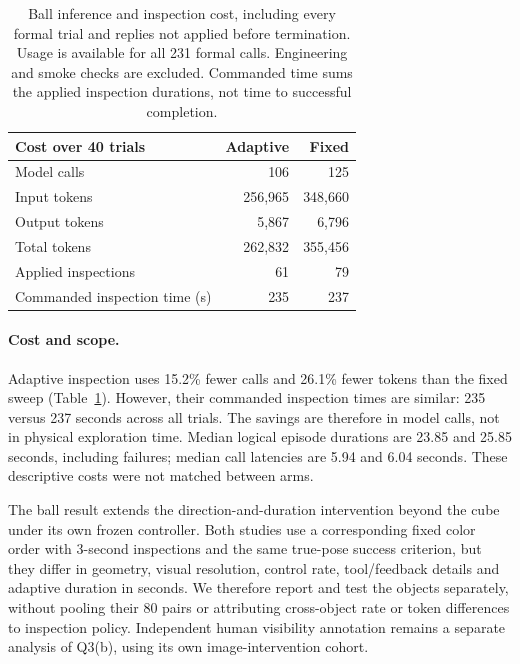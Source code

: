 \begin{table}[t]
\centering\small
\setlength{\tabcolsep}{4pt}
\begin{tabular}{lrr}
\toprule
Cost over 40 trials & Adaptive & Fixed\\
\midrule
Model calls & 106 & 125\\
Input tokens & 256,965 & 348,660\\
Output tokens & 5,867 & 6,796\\
Total tokens & 262,832 & 355,456\\
Applied inspections & 61 & 79\\
Commanded inspection time (s) & 235 & 237\\
\bottomrule
\end{tabular}
\caption{Ball inference and inspection cost, including every formal trial and replies not applied before termination. Usage is available for all 231 formal calls. Engineering and smoke checks are excluded. Commanded time sums the applied inspection durations, not time to successful completion.}
\label{tab:inspection-policy-ball-cost}
\end{table}

\paragraph{Cost and scope.}
Adaptive inspection uses 15.2\% fewer calls and 26.1\% fewer tokens than the fixed sweep (Table~\ref{tab:inspection-policy-ball-cost}). However, their commanded inspection times are similar: 235 versus 237 seconds across all trials. The savings are therefore in model calls, not in physical exploration time. Median logical episode durations are 23.85 and 25.85 seconds, including failures; median call latencies are 5.94 and 6.04 seconds. These descriptive costs were not matched between arms.

The ball result extends the direction-and-duration intervention beyond the cube under its own frozen controller. Both studies use a corresponding fixed color order with 3-second inspections and the same true-pose success criterion, but they differ in geometry, visual resolution, control rate, tool/feedback details and adaptive duration in seconds. We therefore report and test the objects separately, without pooling their 80 pairs or attributing cross-object rate or token differences to inspection policy. Independent human visibility annotation remains a separate analysis of Q3(b), using its own image-intervention cohort.

